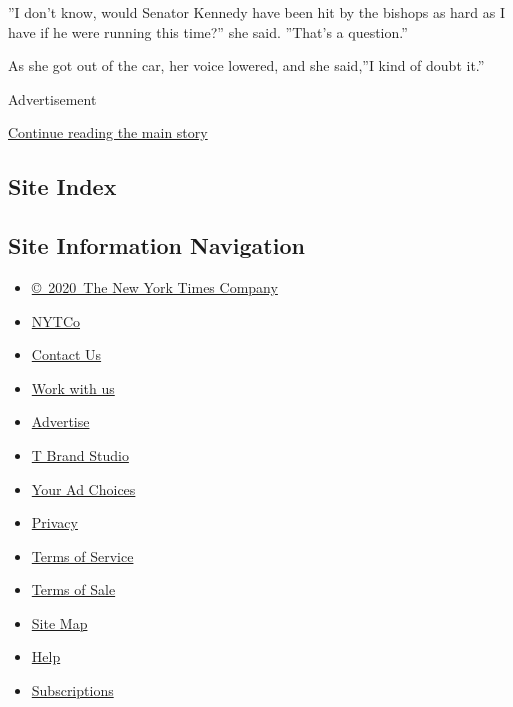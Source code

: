 ''I don't know, would Senator Kennedy have been hit by the bishops as
hard as I have if he were running this time?'' she said. ''That's a
question.''

As she got out of the car, her voice lowered, and she said,''I kind of
doubt it.''

Advertisement

\protect\hyperlink{after-bottom}{Continue reading the main story}

\hypertarget{site-index}{%
\subsection{Site Index}\label{site-index}}

\hypertarget{site-information-navigation}{%
\subsection{Site Information
Navigation}\label{site-information-navigation}}

\begin{itemize}
\tightlist
\item
  \href{https://help.nytimes.com/hc/en-us/articles/115014792127-Copyright-notice}{©~2020~The
  New York Times Company}
\end{itemize}

\begin{itemize}
\tightlist
\item
  \href{https://www.nytco.com/}{NYTCo}
\item
  \href{https://help.nytimes.com/hc/en-us/articles/115015385887-Contact-Us}{Contact
  Us}
\item
  \href{https://www.nytco.com/careers/}{Work with us}
\item
  \href{https://nytmediakit.com/}{Advertise}
\item
  \href{http://www.tbrandstudio.com/}{T Brand Studio}
\item
  \href{https://www.nytimes.com/privacy/cookie-policy\#how-do-i-manage-trackers}{Your
  Ad Choices}
\item
  \href{https://www.nytimes.com/privacy}{Privacy}
\item
  \href{https://help.nytimes.com/hc/en-us/articles/115014893428-Terms-of-service}{Terms
  of Service}
\item
  \href{https://help.nytimes.com/hc/en-us/articles/115014893968-Terms-of-sale}{Terms
  of Sale}
\item
  \href{https://spiderbites.nytimes.com}{Site Map}
\item
  \href{https://help.nytimes.com/hc/en-us}{Help}
\item
  \href{https://www.nytimes.com/subscription?campaignId=37WXW}{Subscriptions}
\end{itemize}

